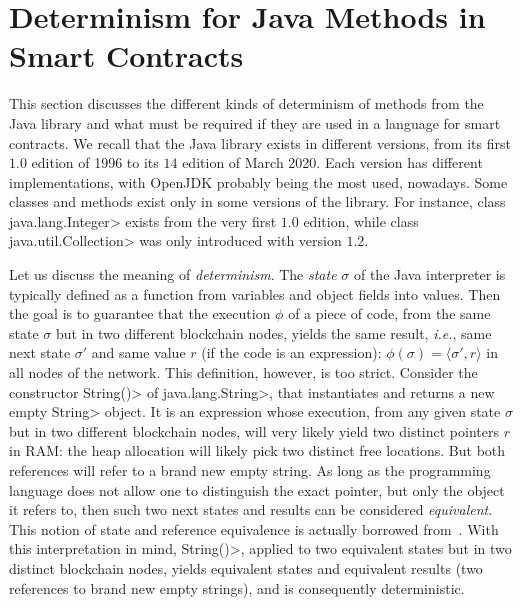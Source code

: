 \section{Determinism for Java Methods in Smart Contracts}\label{sec:determinism}

This section discusses the different kinds of determinism of methods from
the Java library and what must be required if they are used
in a language for smart contracts.
We recall that the Java library exists in different versions, from its first
$1.0$ edition of 1996 to its $14$ edition of March 2020.
Each version has different implementations, with OpenJDK probably being
the most used, nowadays. Some classes and methods exist only in some versions of the library.
For instance, class \<java.lang.Integer> exists from the very first $1.0$ edition,
while class \<java.util.Collection> was only introduced with version $1.2$.

Let us discuss the meaning of \emph{determinism}.
The \emph{state} $\sigma$ of the Java interpreter is typically defined
as a function from variables and object fields into values.
Then the goal is to guarantee that the execution $\phi$ of a piece of code,
from the same state $\sigma$ but in two different blockchain nodes, yields the same result, \emph{i.e.},
same next state $\sigma'$ and same value $r$ (if the code is an expression):
$\phi(\sigma)=\langle\sigma',r\rangle$ in all nodes of the network.
This definition, however, is too strict. Consider the constructor
\<String()> of \<java.lang.String>, that instantiates and returns a new empty \<String>
object. It is an expression whose execution,
from any given state $\sigma$ but in two different blockchain nodes,
will very likely yield two distinct
pointers $r$ in RAM: the heap allocation will likely
pick two distinct free locations.
But both references will refer to a brand new empty string.
As long as the programming language does not allow one to distinguish
the exact pointer, but only the object it refers to,
then such two next states and results can be considered \emph{equivalent}.
This notion of state and reference equivalence is actually borrowed
from~\cite{BanerjeeN05,BarthePR13}.
With this interpretation in mind, \<String()>, applied to two equivalent
states but in two distinct blockchain nodes,
yields equivalent states and equivalent results (two references to
brand new empty strings), and is consequently deterministic.


